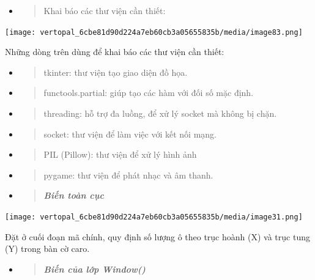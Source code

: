 \documentclass[a4paper]{article}
\begin{document}
\begin{itemize}
\item
  \begin{quote}
  Khai báo các thư viện cần thiết:
  \end{quote}
\end{itemize}

\texttt{[image: vertopal\_6cbe81d90d224a7eb60cb3a05655835b/media/image83.png]}

Những dòng trên dùng để khai báo các thư viện cần thiết:

\begin{itemize}
\item
  \begin{quote}
  tkinter: thư viện tạo giao diện đồ họa.
  \end{quote}
\item
  \begin{quote}
  functools.partial: giúp tạo các hàm với đối số mặc định.
  \end{quote}
\item
  \begin{quote}
  threading: hỗ trợ đa luồng, để xử lý socket mà không bị chặn.
  \end{quote}
\item
  \begin{quote}
  socket: thư viện để làm việc với kết nối mạng.
  \end{quote}
\item
  \begin{quote}
  PIL (Pillow): thư viện để xử lý hình ảnh
  \end{quote}
\item
  \begin{quote}
  pygame: thư viện để phát nhạc và âm thanh.
  \end{quote}
\end{itemize}

\begin{itemize}
\item
  \begin{quote}
  \emph{\textbf{Biến toàn cục}}
  \end{quote}
\end{itemize}

\texttt{[image: vertopal\_6cbe81d90d224a7eb60cb3a05655835b/media/image31.png]}

Đặt ở cuối đoạn mã chính, quy định số lượng ô theo trục hoành (X) và
trục tung (Y) trong bàn cờ caro.

\begin{itemize}
\item
  \begin{quote}
  \emph{\textbf{Biến của lớp Window()}}
  \end{quote}
\end{itemize}
\end{document}
